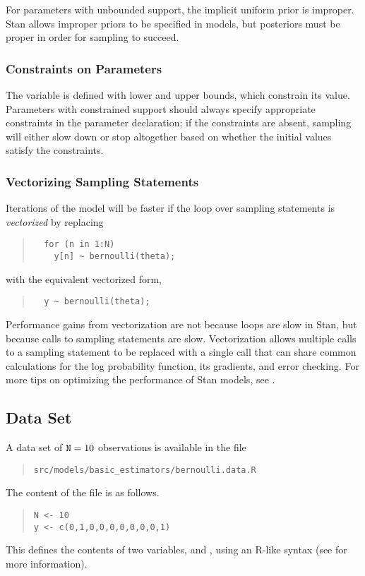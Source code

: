 For parameters with unbounded support, the implicit uniform prior is
improper.  Stan allows improper priors to be specified in models, but
posteriors must be proper in order for sampling to succeed.


\subsubsection{Constraints on Parameters}

The variable  is defined with lower and upper bounds,
which constrain its value.  Parameters with constrained support should
always specify appropriate constraints in the parameter declaration;
if the constraints are absent, sampling will either slow down or stop
altogether based on whether the initial values satisfy the constraints.

\subsubsection{Vectorizing Sampling Statements}

Iterations of the model will be faster if the loop over sampling
statements is \textit{vectorized} by replacing
%
\begin{quote}
\begin{Verbatim}
  for (n in 1:N) 
    y[n] ~ bernoulli(theta);
\end{Verbatim}
\end{quote}
%
with the equivalent vectorized form,
%
\begin{quote}
\begin{Verbatim}
  y ~ bernoulli(theta);
\end{Verbatim}
\end{quote}
%
Performance gains from vectorization are not because loops are slow in
Stan, but because calls to sampling statements are slow.
Vectorization allows multiple calls to a sampling statement to be
replaced with a single call that can share common calculations for the
log probability function, its gradients, and error checking.  For more
tips on optimizing the performance of Stan models, see
.


\subsection{Data Set}

A data set of $\mbox{\code{N}}=10$ observations is available in the file
%
\begin{quote}
\nolinkurl{src/models/basic_estimators/bernoulli.data.R}
\end{quote}
%
The content of the file is as follows.
%
\begin{quote}
\begin{Verbatim}
N <- 10
y <- c(0,1,0,0,0,0,0,0,0,1)
\end{Verbatim}
\end{quote}
%
This defines the contents of two variables,  and ,
using an R-like syntax (see  for more information).



